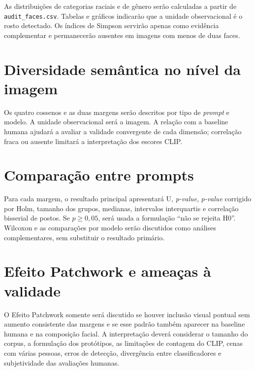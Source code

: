 As distribuições de categorias raciais e de gênero serão calculadas a partir de \texttt{audit\_\allowbreak faces.csv}. Tabelas e gráficos indicarão que a unidade observacional é o rosto detectado. Os índices de Simpson servirão apenas como evidência complementar e permanecerão ausentes em imagens com menos de duas faces.

\section{Diversidade semântica no nível da imagem}

Os quatro cossenos e as duas margens serão descritos por tipo de \textit{prompt} e modelo. A unidade observacional será a imagem. A relação com a baseline humana ajudará a avaliar a validade convergente de cada dimensão; correlação fraca ou ausente limitará a interpretação dos escores CLIP.

\section{Comparação entre prompts}

Para cada margem, o resultado principal apresentará U, \textit{p-value}, \textit{p-value} corrigido por Holm, tamanho dos grupos, medianas, intervalos interquartis e correlação bisserial de postos. Se $p \geq 0,05$, será usada a formulação ``não se rejeita H0''. Wilcoxon e as comparações por modelo serão discutidos como análises complementares, sem substituir o resultado primário.

\section{Efeito Patchwork e ameaças à validade}

O Efeito Patchwork somente será discutido se houver inclusão visual pontual sem aumento consistente das margens e se esse padrão também aparecer na baseline humana e na composição facial. A interpretação deverá considerar o tamanho do corpus, a formulação dos protótipos, as limitações de contagem do CLIP, cenas com várias pessoas, erros de detecção, divergência entre classificadores e subjetividade das avaliações humanas.

